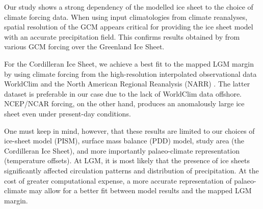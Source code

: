 \conclusions
\label{sec:concl}

Our study shows a strong dependency of the modelled ice sheet to the choice of climate forcing data. When using input climatologies from climate reanalyses, spatial resolution of the GCM appears critical for providing the ice sheet model with an accurate precipitation field. This confirms results obtained by \citet{quiquet-etal-2012} from various GCM forcing over the Greenland Ice Sheet.

For the Cordilleran Ice Sheet, we achieve a best fit to the mapped LGM margin by \citet{dyke-2004} using climate forcing from the high-resolution interpolated observational data WorldClim \citep{data:worldclim} and the North American Regional Reanalysis (NARR) \citep{data:narr}. The latter dataset is preferable in our case due to the lack of WorldClim data offshore. NCEP/NCAR forcing, on the other hand, produces an anomalously large ice sheet even under present-day conditions. 

One must keep in mind, however, that these results are limited to our choices of ice-sheet model (PISM), surface mass balance (PDD) model, study area (the Cordilleran Ice Sheet), and more importantly palaeo-climate representation (temperature offsets). At LGM, it is most likely that the presence of ice sheets significantly affected circulation patterns and distribution of precipitation. At the cost of greater computational expense, a more accurate representation of palaeo-climate may allow for a better fit between model results and the mapped LGM margin.
